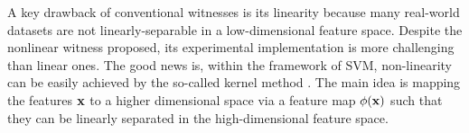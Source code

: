 \documentclass[
aps,
pra,
twocolumn,
floatfix,
]{revtex4-2}
\theoremstyle{plain}
\theoremstyle{definition}
\newcommand{\kernel}{k}
\begin{document}
A key drawback of conventional witnesses is its linearity because many real-world datasets are not linearly-separable in a low-dimensional feature space.
Despite the nonlinear witness \cite{guhneNonlinearEntanglementWitnesses2006} proposed, its experimental implementation is more challenging than linear ones.
The good news is,
within the framework of SVM, non-linearity can be easily achieved by the so-called kernel method \cite{hofmannKernelMethodsMachine2008}.
The main idea is mapping the features $\vb{x}$ to a higher dimensional space via a feature map $\phi(\vb{x})$ such that they can be linearly separated in the high-dimensional feature space.
\end{document}

